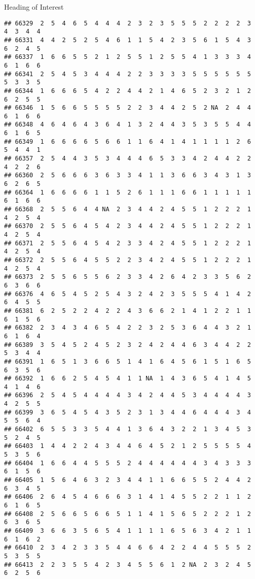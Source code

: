 \documentclass[
  ignorenonframetext,
]{beamer}
\begin{document}
\begin{frame}[fragile]{Heading of Interest}
\begin{verbatim}
## 66329  2  5  4  6  5  4  4  4  2  3  2  3  5  5  5  2  2  2  2  3  4  3  4  4
## 66331  4  4  2  5  2  5  4  6  1  1  5  4  2  3  5  6  1  5  4  3  6  2  4  5
## 66337  1  6  6  5  5  2  1  2  5  5  1  2  5  5  4  1  3  3  3  4  6  1  6  6
## 66341  2  5  4  5  3  4  4  4  2  2  3  3  3  3  5  5  5  5  5  5  5  3  3  5
## 66344  1  6  6  6  5  4  2  2  4  4  2  1  4  6  5  2  3  2  1  2  6  2  5  5
## 66346  1  5  6  6  5  5  5  5  2  2  3  4  4  2  5  2 NA  2  4  4  6  1  6  6
## 66348  4  6  4  6  4  3  6  4  1  3  2  4  4  3  5  3  5  5  4  4  6  1  6  5
## 66349  1  6  6  6  6  5  6  6  1  1  6  4  1  4  1  1  1  1  2  6  5  4  4  1
## 66357  2  5  4  4  3  5  3  4  4  4  6  5  3  3  4  2  4  4  2  2  4  2  2  6
## 66360  2  5  6  6  6  3  6  3  3  4  1  1  3  6  6  3  4  3  1  3  6  2  6  5
## 66364  1  6  6  6  6  1  1  5  2  6  1  1  1  6  6  1  1  1  1  1  6  1  6  6
## 66368  2  5  5  6  4  4 NA  2  3  4  4  2  4  5  5  1  2  2  2  1  4  2  5  4
## 66370  2  5  5  6  4  5  4  2  3  4  4  2  4  5  5  1  2  2  2  1  4  2  5  4
## 66371  2  5  5  6  4  5  4  2  3  3  4  2  4  5  5  1  2  2  2  1  4  2  5  4
## 66372  2  5  5  6  4  5  5  2  2  3  4  2  4  5  5  1  2  2  2  1  4  2  5  4
## 66373  2  5  5  6  5  5  6  2  3  3  4  2  6  4  2  3  3  5  6  2  6  3  6  6
## 66376  4  6  5  4  5  2  5  4  3  2  4  2  3  5  5  5  4  1  4  2  6  4  5  5
## 66381  6  2  5  2  2  4  2  2  4  3  6  6  2  1  4  1  2  2  1  1  6  1  5  6
## 66382  2  3  4  3  4  6  5  4  2  2  3  2  5  3  6  4  4  3  2  1  6  1  6  4
## 66389  3  5  4  5  2  4  5  2  3  2  4  2  4  4  6  3  4  4  2  2  5  3  4  4
## 66391  1  6  5  1  3  6  6  5  1  4  1  6  4  5  6  1  5  1  6  5  6  3  5  6
## 66392  1  6  6  2  5  4  5  4  1  1 NA  1  4  3  6  5  4  1  4  5  4  1  4  6
## 66396  2  5  4  5  4  4  4  4  3  4  2  4  4  5  3  4  4  4  4  3  4  2  5  5
## 66399  3  6  5  4  5  4  3  5  2  3  1  3  4  4  6  4  4  4  3  4  5  5  6  4
## 66402  6  5  5  3  3  5  4  4  1  3  6  4  3  2  2  1  3  4  5  3  5  2  4  5
## 66403  1  4  4  2  2  4  3  4  4  6  4  5  2  1  2  5  5  5  5  4  5  3  5  6
## 66404  1  6  6  4  4  5  5  5  2  4  4  4  4  4  4  3  4  3  3  3  6  1  5  6
## 66405  1  5  6  4  6  3  2  3  4  4  1  1  6  6  5  5  2  4  4  2  6  3  4  5
## 66406  2  6  4  5  4  6  6  6  3  1  4  1  4  5  5  2  2  1  1  2  6  1  6  5
## 66408  2  5  6  6  5  6  6  5  1  1  4  1  5  6  5  2  2  2  1  2  6  3  6  5
## 66409  3  6  6  3  5  6  5  4  1  1  1  1  6  5  6  3  4  2  1  1  6  1  6  2
## 66410  2  3  4  2  3  3  5  4  4  6  6  4  2  2  4  4  5  5  5  2  5  3  5  5
## 66413  2  2  3  5  5  4  2  3  4  5  5  6  1  2 NA  2  3  2  4  5  6  2  5  6

\end{verbatim}
\end{frame}
\end{document}
